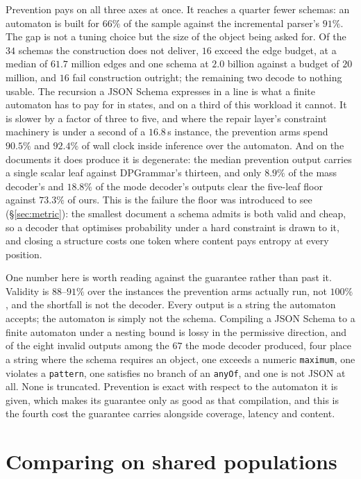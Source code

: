 Prevention pays on all three axes at once. It reaches a quarter fewer schemas: an
automaton is built for $66\%$ of the sample against the incremental parser's
$91\%$. The gap is not a tuning choice but the size of the object being asked
for. Of the $34$ schemas the construction does not deliver, $16$ exceed the edge
budget, at a median of $61.7$ million edges and one schema at $2.0$ billion
against a budget of $20$ million, and $16$ fail construction outright; the
remaining two decode to nothing usable. The recursion a JSON Schema expresses in
a line is what a finite automaton has to pay for in states, and on a third of
this workload it cannot. It is
slower by a factor of three to five, and where the repair layer's constraint
machinery is under a second of a $16.8$\,s instance, the prevention arms spend
$90.5\%$ and $92.4\%$ of wall clock inside inference over the automaton. And on
the documents it does produce it is degenerate: the median prevention output
carries a single scalar leaf against DPGrammar's thirteen, and only $8.9\%$ of
the mass decoder's and $18.8\%$ of the mode decoder's outputs clear the
five-leaf floor against $73.3\%$ of ours. This is the failure the floor was
introduced to see (\S\ref{sec:metric}): the smallest document a schema admits is
both valid and cheap, so a decoder that optimises probability under a hard
constraint is drawn to it, and closing a structure costs one token where content
pays entropy at every position.

One number here is worth reading against the guarantee rather than past it.
Validity is $88$--$91\%$ over the instances the prevention arms actually run, not
$100\%$, and the shortfall is not the decoder. Every output is a string the
automaton accepts; the automaton is simply not the schema. Compiling a JSON
Schema to a finite automaton under a nesting bound is lossy in the permissive
direction, and of the eight invalid outputs among the $67$ the mode decoder
produced, four place a string where the schema requires an object, one exceeds a
numeric \texttt{maximum}, one violates a \texttt{pattern}, one satisfies no branch of an
\texttt{anyOf}, and one is not JSON at all. None is truncated. Prevention is exact with respect to the automaton it is
given, which makes its guarantee only as good as that compilation, and this is
the fourth cost the guarantee carries alongside coverage, latency and content.

\section{Comparing on shared populations}
\label{sec:coverage}

